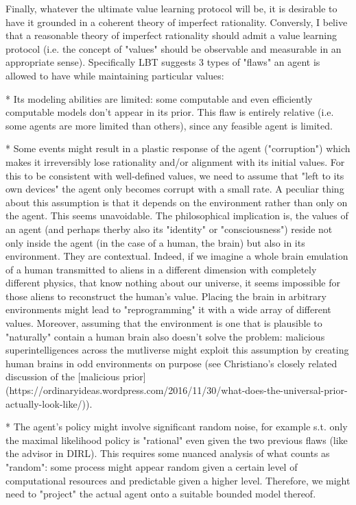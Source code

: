 \documentclass[a4paper]{article}
\begin{document}
Finally, whatever the ultimate value learning protocol will be, it is desirable to have it grounded in a coherent theory of imperfect rationality. Conversly, I belive that a reasonable theory of imperfect rationality should admit a value learning protocol (i.e. the concept of "values" should be observable and measurable in an appropriate sense). Specifically LBT suggests 3 types of "flaws" an agent is allowed to have while maintaining particular values:

* Its modeling abilities are limited: some computable and even efficiently computable models don't appear in its prior. This flaw is entirely relative (i.e. some agents are more limited than others), since any feasible agent is limited.

* Some events might result in a plastic response of the agent ("corruption") which makes it irreversibly lose rationality and/or alignment with its initial values. For this to be consistent with well-defined values, we need to assume that "left to its own devices" the agent only becomes corrupt with a small rate. A peculiar thing about this assumption is that it depends on the environment rather than only on the agent. This seems unavoidable. The philosophical implication is, the values of an agent (and perhaps therby also its "identity" or "consciousness") reside not only inside the agent (in the case of a human, the brain) but also in its environment. They are contextual. Indeed, if we imagine a whole brain emulation of a human transmitted to aliens in a different dimension with completely different physics, that know nothing about our universe, it seems impossible for those aliens to reconstruct the human's value. Placing the brain in arbitrary environments might lead to "reprogramming" it with a wide array of different values. Moreover, assuming that the environment is one that is plausible to "naturally" contain a human brain also doesn't solve the problem: malicious superintelligences across the mutliverse might exploit this assumption by creating human brains in odd environments on purpose (see Christiano's closely related discussion of the [malicious prior](https://ordinaryideas.wordpress.com/2016/11/30/what-does-the-universal-prior-actually-look-like/)).

* The agent's policy might involve significant random noise, for example s.t. only the maximal likelihood policy is "rational" even given the two previous flaws (like the advisor in DIRL). This requires some nuanced analysis of what counts as "random": some process might appear random given a certain level of computational resources and predictable given a higher level. Therefore, we might need to "project" the actual agent onto a suitable bounded model thereof.
\end{document}
